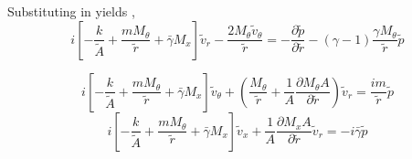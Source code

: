 








Substituting in yields ,%
\[ \boxed{i\left[ 
- \frac{k}{\tilde{A}} + 
\frac{m M_{\theta}}{\tilde{r}} + 
\bar{\gamma} M_x 
\right] \tilde{v}_r - 
\frac{2 M_{\theta} \tilde{v}_{\theta}}{\tilde{r}} = 
-\frac{\partial \tilde{p}}{\partial \tilde{r}} - (\gamma-1)\frac{\gamma M_{\theta}}{\tilde{r}}\tilde{p}}  \] 


\[\boxed{i\left[ - \frac{k}{\tilde{A}} + \frac{m M_{\theta}}{\tilde{r}} + \bar{\gamma} M_x \right] \tilde{v}_{\theta} + \left(\frac{ M_{\theta}}{\tilde{r}}  + \frac{1}{A} \frac{\partial M_{\theta}A}{\partial \tilde{r}}\right)\tilde{v}_r = \frac{i m}{\tilde{r}}\tilde{p}}\]         
\[\boxed{i\left[ - \frac{k}{\tilde{A}} + \frac{m M_{\theta}}{\tilde{r}} + \bar{\gamma} M_x \right] \tilde{v}_x  + \frac{1}{A} \frac{\partial M_x A}{\partial \tilde{r}}\tilde{v}_r = -i \bar{\gamma}\tilde{p}} \]

